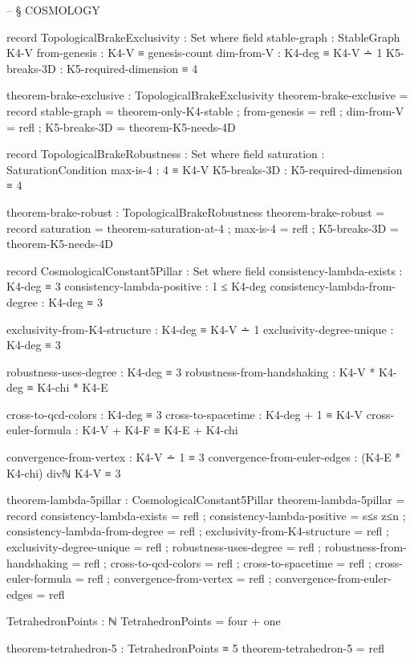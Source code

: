 \documentclass[11pt,a4paper]{book}
\begin{document}
\begin{code}
-- § COSMOLOGY

record TopologicalBrakeExclusivity : Set where
  field
    stable-graph          : StableGraph K4-V
    from-genesis          : K4-V ≡ genesis-count
    dim-from-V            : K4-deg ≡ K4-V ∸ 1
    K5-breaks-3D          : K5-required-dimension ≡ 4

theorem-brake-exclusive : TopologicalBrakeExclusivity
theorem-brake-exclusive = record
  { stable-graph = theorem-only-K4-stable
  ; from-genesis = refl
  ; dim-from-V = refl
  ; K5-breaks-3D = theorem-K5-needs-4D
  }


record TopologicalBrakeRobustness : Set where
  field
    saturation    : SaturationCondition
    max-is-4      : 4 ≡ K4-V
    K5-breaks-3D  : K5-required-dimension ≡ 4

theorem-brake-robust : TopologicalBrakeRobustness
theorem-brake-robust = record
  { saturation = theorem-saturation-at-4
  ; max-is-4 = refl
  ; K5-breaks-3D = theorem-K5-needs-4D
  }

record CosmologicalConstant5Pillar : Set where
  field
    consistency-lambda-exists : K4-deg ≡ 3
    consistency-lambda-positive : 1 ≤ K4-deg
    consistency-lambda-from-degree : K4-deg ≡ 3
    
    exclusivity-from-K4-structure : K4-deg ≡ K4-V ∸ 1
    exclusivity-degree-unique : K4-deg ≡ 3
    
    robustness-uses-degree : K4-deg ≡ 3
    robustness-from-handshaking : K4-V * K4-deg ≡ K4-chi * K4-E
    
    cross-to-qcd-colors : K4-deg ≡ 3
    cross-to-spacetime : K4-deg + 1 ≡ K4-V
    cross-euler-formula : K4-V + K4-F ≡ K4-E + K4-chi
    
    convergence-from-vertex : K4-V ∸ 1 ≡ 3
    convergence-from-euler-edges : (K4-E * K4-chi) divℕ K4-V ≡ 3

theorem-lambda-5pillar : CosmologicalConstant5Pillar
theorem-lambda-5pillar = record
  { consistency-lambda-exists = refl
  ; consistency-lambda-positive = s≤s z≤n
  ; consistency-lambda-from-degree = refl
  ; exclusivity-from-K4-structure = refl
  ; exclusivity-degree-unique = refl
  ; robustness-uses-degree = refl
  ; robustness-from-handshaking = refl
  ; cross-to-qcd-colors = refl
  ; cross-to-spacetime = refl
  ; cross-euler-formula = refl
  ; convergence-from-vertex = refl
  ; convergence-from-euler-edges = refl
  }

TetrahedronPoints : ℕ
TetrahedronPoints = four + one

theorem-tetrahedron-5 : TetrahedronPoints ≡ 5
theorem-tetrahedron-5 = refl


\end{code}
\end{document}
